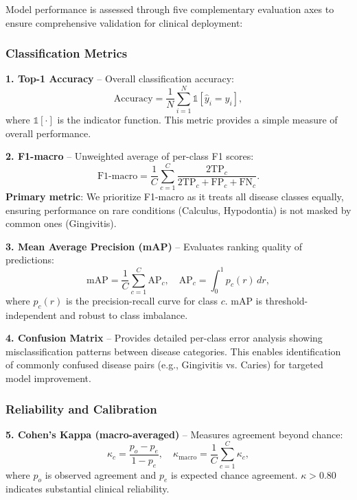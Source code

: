 Model performance is assessed through five complementary evaluation axes to ensure comprehensive validation for clinical deployment:

\subsubsection{Classification Metrics}

\textbf{1. Top-1 Accuracy} -- Overall classification accuracy:
\begin{equation}
\text{Accuracy} = \frac{1}{N}\sum_{i=1}^{N} \mathbb{1}[\hat{y}_i = y_i],
\end{equation}
where $\mathbb{1}[\cdot]$ is the indicator function. This metric provides a simple measure of overall performance.

\textbf{2. F1-macro} -- Unweighted average of per-class F1 scores:
\begin{equation}
\text{F1-macro} = \frac{1}{C}\sum_{c=1}^{C} \frac{2\text{TP}_c}{2\text{TP}_c + \text{FP}_c + \text{FN}_c}.
\end{equation}
\textbf{Primary metric}: We prioritize F1-macro as it treats all disease classes equally, ensuring performance on rare conditions (Calculus, Hypodontia) is not masked by common ones (Gingivitis).

\textbf{3. Mean Average Precision (mAP)} -- Evaluates ranking quality of predictions:
\begin{equation}
\text{mAP} = \frac{1}{C}\sum_{c=1}^{C} \text{AP}_c, \quad \text{AP}_c = \int_0^1 p_c(r) \, dr,
\end{equation}
where $p_c(r)$ is the precision-recall curve for class $c$. mAP is threshold-independent and robust to class imbalance.

\textbf{4. Confusion Matrix} -- Provides detailed per-class error analysis showing misclassification patterns between disease categories. This enables identification of commonly confused disease pairs (e.g., Gingivitis vs. Caries) for targeted model improvement.

\subsubsection{Reliability and Calibration}

\textbf{5. Cohen's Kappa (macro-averaged)} -- Measures agreement beyond chance:
\begin{equation}
\kappa_c = \frac{p_o - p_e}{1 - p_e}, \quad \kappa_{\text{macro}} = \frac{1}{C}\sum_{c=1}^C \kappa_c,
\end{equation}
where $p_o$ is observed agreement and $p_e$ is expected chance agreement. $\kappa > 0.80$ indicates substantial clinical reliability.

